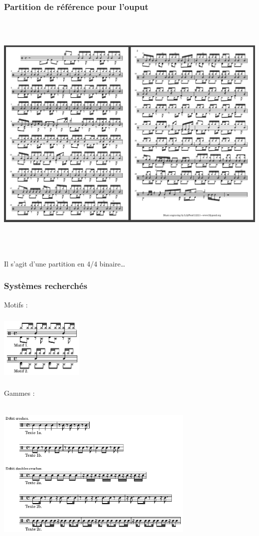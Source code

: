 \subsubsection{Partition de référence pour l’ouput}
\includegraphics[height=120mm, width=160mm]{z_images/4_experimentations/experience_1/partition.png}\\\\
Il s’agit d’une partition en 4/4 binaire…\newpage
\subsubsection{Systèmes recherchés}
Motifs :\\\\
\includegraphics[height=30mm, width=40mm]{z_images/1_description_notation/systemes/1_motifs_4-4_binaires.png}\\\\
Gammes :\\\\
\includegraphics[height=70mm, width=95mm]{z_images/1_description_notation/systemes/0_textes_4-4_binaires.png}\\

